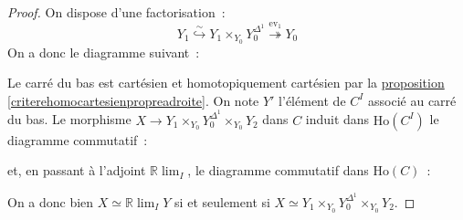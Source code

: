 \documentclass{amsart}
\newcommand{\sref}[2]{\hyperref[#2]{#1 \ref*{#2}}}
\theoremstyle{plain}
\theoremstyle{definition}
\theoremstyle{remark}
\newcommand{\Ho}[1]{\mathrm{Ho}({#1})}
\newcommand{\ra}{\rightarrow}
\begin{document}
\begin{proof}
  On dispose d'une factorisation~:
  $$Y_1\overset{\sim}{\hookrightarrow} Y_1\times_{Y_0}Y_0^{\Delta^1} \overset{\mathrm{ev}_1}{\twoheadrightarrow} Y_0$$
  On a donc le diagramme suivant~:
  \begin{center}
  \end{center}
  Le carré du bas est cartésien et homotopiquement cartésien par la \sref{proposition}{criterehomocartesienpropreadroite}.
  On note $Y'$ l'élément de $C^I$ associé au carré du bas.
  Le morphisme $X\ra Y_1\times_{Y_0}Y_0^{\Delta^1}\times_{Y_0}Y_2$ dans $C$ induit dans $\Ho{C^I}$ le diagramme commutatif~:
  \begin{center}
  \end{center}
  et, en passant à l'adjoint $\mathbb{R}\lim_I$, le diagramme commutatif dans $\Ho{C}$~:
  \begin{center}
  \end{center}
  On a donc bien $X\simeq \mathbb{R}\lim_I Y$ si et seulement si $X\simeq Y_1\times_{Y_0}Y_0^{\Delta^1}\times_{Y_0}Y_2$.
\end{proof}
\end{document}
